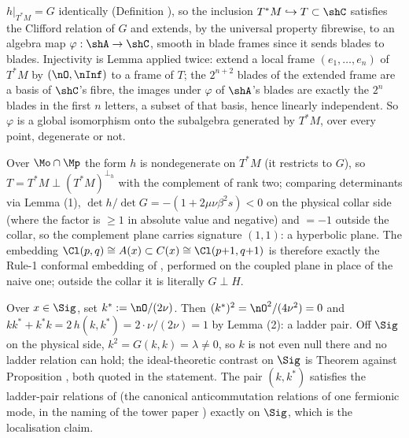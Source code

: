 $h|_{T^*M} = G$ identically (Definition ), so the inclusion $T^*M \hookrightarrow T \subset \shC$ satisfies the Clifford relation of $G$ and extends, by the universal property fibrewise, to an algebra map $\varphi : \shA \to \shC$, smooth in blade frames since it sends blades to blades. Injectivity is Lemma  applied twice: extend a local frame $(e_1, \dots, e_n)$ of $T^*M$ by $(\nO, \nInf)$ to a frame of $T$; the $2^{n+2}$ blades of the extended frame are a basis of $\shC$'s fibre, the images under $\varphi$ of $\shA$'s blades are exactly the $2^n$ blades in the first $n$ letters, a subset of that basis, hence linearly independent. So $\varphi$ is a global isomorphism onto the subalgebra generated by $T^*M$, over every point, degenerate or not.

Over $\Mo \cap \Mp$ the form $h$ is nondegenerate on $T^*M$ (it restricts to $G$), so $T = T^*M \perp (T^*M)^{\perp_h}$ with the complement of rank two; comparing determinants via Lemma (1), $\det h / \det G = -(1 + 2\mu\nu\beta^2 s) < 0$ on the physical collar side (where the factor is $\geq 1$ in absolute value and negative) and $= -1$ outside the collar, so the complement plane carries signature $(1,1)$: a hyperbolic plane. The embedding $\Cl(p,q) \cong A(x) \subset C(x) \cong \Cl(p{+}1, q{+}1)$ is therefore exactly the Rule-1 conformal embedding of \cite[\S4.3]{ButlerT1}, performed on the coupled plane in place of the naive one; outside the collar it is literally $G \perp H$.

Over $x \in \Sig$, set $k^* := \nO/(2\nu)$. Then $(k^*)^2 = \nO^2/(4\nu^2) = 0$ and $k k^* + k^* k = 2\,h(k, k^*) = 2 \cdot \nu/(2\nu) = 1$ by Lemma (2): a ladder pair. Off $\Sig$ on the physical side, $k^2 = G(k,k) = \lambda \neq 0$, so $k$ is not even null there and no ladder relation can hold; the ideal-theoretic contrast on $\Sig$ is Theorem  against Proposition , both quoted in the statement. The pair $(k, k^*)$ satisfies the ladder-pair relations of \cite[\S7]{ButlerT1} (the canonical anticommutation relations of one fermionic mode, in the naming of the tower paper \cite{ButlerT3}) exactly on $\Sig$, which is the localisation claim.
